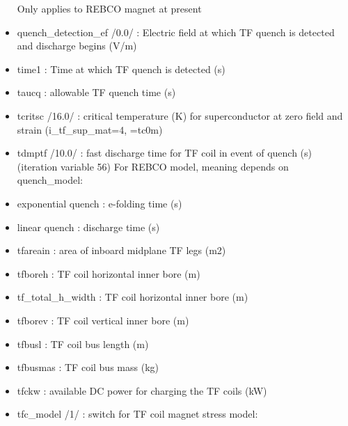 \documentclass[]{article}
\begin{document}
\begin{itemize}
  Only applies to REBCO magnet at present
\item
  quench\_detection\_ef /0.0/ : Electric field at which TF quench is
  detected and discharge begins (V/m)
\item
  time1 : Time at which TF quench is detected (s)
\item
  taucq : allowable TF quench time (s)
\item
  tcritsc /16.0/ : critical temperature (K) for superconductor at zero
  field and strain (i\_tf\_sup\_mat=4, =tc0m)
\item
  tdmptf /10.0/ : fast discharge time for TF coil in event of quench (s)
  (iteration variable 56) For REBCO model, meaning depends on
  quench\_model:
\item
  exponential quench : e-folding time (s)
\item
  linear quench : discharge time (s)
\item
  tfareain : area of inboard midplane TF legs (m2)
\item
  tfboreh : TF coil horizontal inner bore (m)
\item
  tf\_total\_h\_width : TF coil horizontal inner bore (m)
\item
  tfborev : TF coil vertical inner bore (m)
\item
  tfbusl : TF coil bus length (m)
\item
  tfbusmas : TF coil bus mass (kg)
\item
  tfckw : available DC power for charging the TF coils (kW)
\item
  tfc\_model /1/ : switch for TF coil magnet stress model:


\end{itemize}
\end{document}
